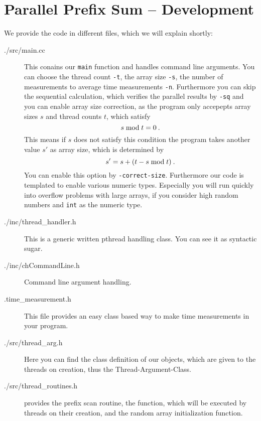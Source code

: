 \documentclass[oneside,a4paper]{scrartcl}
\begin{document}

\section{Parallel Prefix Sum -- Development}
\label{dev}
We provide the code in different files, which we will explain shortly:
\begin{description}
	\item[./src/main.cc] This conains our \texttt{main} function and handles
	command line arguments. You can choose the thread count \texttt{-t},
	the array size \texttt{-s}, the number of measurements to average
	time measurements \texttt{-n}. Furthermore you can skip the 
	sequential calculation, which verifies the parallel results by
	\texttt{-sq} and you can enable array size correction, as the
	program only accepepts array sizes $s$ and thread counts $t$, which
	satisfy
	\[s \;\textnormal{mod}\; t = 0\:.\]
	This means if $s$ does not satisfy this condition the program
	takes another value $s'$ as array size, which is determined by
	\[ s' = s + (t - s\;\textnormal{mod}\; t)\:.\]
	You can enable this option by \texttt{-correct-size}. Furthermore
	our code is templated to enable various numeric types. Especially
	you will run quickly into overflow problems with large arrays, if you
	consider high random numbers and \texttt{int} as the numeric type.
	\item[./inc/thread\_handler.h] This is a generic written
	pthread handling class. You can see it as syntactic sugar.
	\item[./inc/chCommandLine.h] Command line argument handling.
	\item[.time\_measurement.h] This file provides an easy class based way
	to make time measurements in your program.
	\item[./src/thread\_arg.h] Here you can find the class definition of
	our objects, which are given to the threads on creation, thus the
	Thread-Argument-Class.
	\item[./src/thread\_routines.h] provides the prefix scan routine,
	the function, which will be executed by threads on their creation,
	and the random array initialization function.
\end{description}
\end{document}
